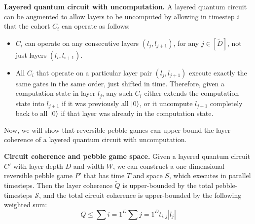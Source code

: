 \begin{definition}{\textbf{Layered quantum circuit with uncomputation.}}
A layered quantum circuit can be augmented to allow layers to be uncomputed
by allowing in timestep $i$ that the cohort $C_i$ can operate as follows:

\begin{itemize}
\item $C_i$ can operate on any consecutive layers $(l_{j},l_{j+1})$,
for any $j \in [\tilde{D}]$,
not just layers $(l_{i},l_{i+1})$.
\item All $C_i$ that operate on a particular layer pair $(l_{j},l_{j+1})$
execute exactly the same gates in the same order, just shifted in time.
Therefore, given a computation state in layer $l_{j}$, any such
$C_i$ either extends the computation state into $l_{j+1}$ if it
was previously all $\left\vert{0}\right\rangle$, or it uncompute $l_{j+1}$ completely
back to all $\left\vert{0}\right\rangle$ if that layer was already in the computation state.
\end{itemize}
\end{definition}


Now, we will show that reversible pebble games can upper-bound the
layer coherence of a layered quantum circuit with uncomputation.

\begin{theorem}{\textbf{Circuit coherence and pebble game space.}}
Given a layered quantum circuit $C'$ with layer depth $D$ and width $W$, we
can construct a one-dimensional
reversible pebble game $P'$ that has time $T$
and space $S$, which executes in parallel timesteps.
Then the layer coherence $\tilde{Q}$ is upper-bounded by the
total pebble-timesteps $\mathcal{S}$, and the total circuit coherence
is upper-bounded by the following weighted sum:
\begin{equation}
Q \le \sum{i=1}^D \sum{j=1}^D t_{i,j} |l_j|
\end{equation}
\label{thm:pg-cc}
\end{theorem}

